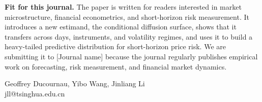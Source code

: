\documentclass[11pt,a4paper]{article}
\begin{document}
\bigskip
\noindent\textbf{Fit for this journal.}
The paper is written for readers interested in market microstructure, financial
econometrics, and short-horizon risk measurement. It introduces a new estimand, the
conditional diffusion surface, shows that it transfers across days, instruments, and
volatility regimes, and uses it to build a heavy-tailed predictive distribution for
short-horizon price risk. We are submitting it to [Journal name] because the journal
regularly publishes empirical work on forecasting, risk measurement, and financial
market dynamics.

\bigskip
\noindent Geoffrey Ducournau, Yibo Wang, Jinliang Li\\
\noindent jll@tsinghua.edu.cn
\end{document}
